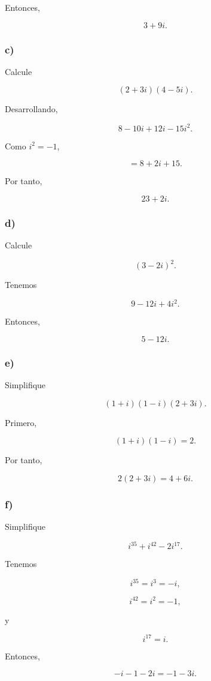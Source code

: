 \documentclass[12pt]{article}
\begin{document}
Entonces,

\[
\boxed{3+9i}.
\]

\subsubsection*{c)}

Calcule

\[
(2+3i)(4-5i).
\]

Desarrollando,

\[
8-10i+12i-15i^2.
\]

Como \(i^2=-1\),

\[
=8+2i+15.
\]

Por tanto,

\[
\boxed{23+2i}.
\]

\subsubsection*{d)}

Calcule

\[
(3-2i)^2.
\]

Tenemos

\[
9-12i+4i^2.
\]

Entonces,

\[
\boxed{5-12i}.
\]

\subsubsection*{e)}

Simplifique

\[
(1+i)(1-i)(2+3i).
\]

Primero,

\[
(1+i)(1-i)=2.
\]

Por tanto,

\[
2(2+3i)
=
\boxed{4+6i}.
\]

\subsubsection*{f)}

Simplifique

\[
i^{35}+i^{42}-2i^{17}.
\]

Tenemos

\[
i^{35}=i^3=-i,
\]

\[
i^{42}=i^2=-1,
\]

y

\[
i^{17}=i.
\]

Entonces,

\[
-i-1-2i
=
\boxed{-1-3i}.
\]
\end{document}
